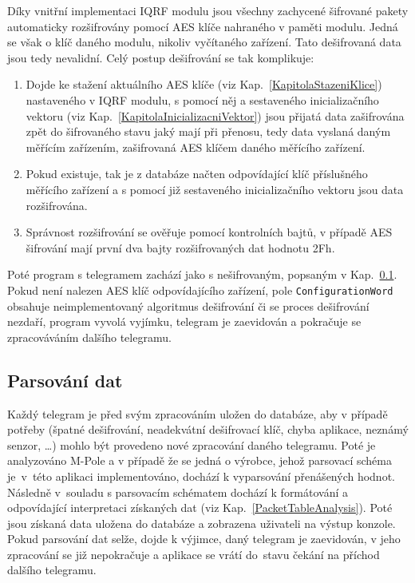 Díky vnitřní implementaci IQRF modulu jsou všechny zachycené šifrované pakety automaticky rozšifrovány pomocí AES klíče nahraného v paměti modulu. Jedná se však o klíč daného modulu, nikoliv vyčítaného zařízení. Tato dešifrovaná data jsou tedy nevalidní. Celý postup dešifrování se tak komplikuje:

\begin{enumerate}
	\item Dojde ke stažení aktuálního AES klíče (viz Kap.~\ref{KapitolaStazeniKlice}) nastaveného v IQRF modulu, s pomocí něj a sestaveného inicializačního vektoru (viz Kap.~\ref{KapitolaInicializacniVektor})
jsou přijatá data zašifrována zpět do šifrovaného stavu jaký mají při přenosu, tedy data vyslaná daným měřícím zařízením, zašifrovaná AES klíčem daného měřícího zařízení.
	\item Pokud existuje, tak je z databáze načten odpovídající klíč příslušného měřícího zařízení a s pomocí již sestaveného inicializačního vektoru jsou data rozšifrována.
	\item Správnost rozšifrování se ověřuje pomocí kontrolních bajtů, v případě AES šifrování mají první dva bajty rozšifrovaných dat hodnotu 2Fh.
\end{enumerate}

Poté program s telegramem zachází jako s nešifrovaným, popsaným v Kap.~\ref{KapitolaParsovani}. Pokud není nalezen AES klíč odpovídajícího zařízení, pole \texttt{ConfigurationWord} obsahuje neimplementovaný algoritmus dešifrování či se proces dešifrování nezdaří, program vyvolá vyjímku, telegram je zaevidován a pokračuje se zpracováváním dalšího telegramu.

\subsection{Parsování dat}
\label{KapitolaParsovani}
Každý telegram je před svým zpracováním uložen do databáze, aby v případě potřeby (špatné dešifrování, neadekvátní dešifrovací klíč, chyba aplikace, neznámý senzor, \ldots) mohlo být provedeno nové zpracování daného telegramu. Poté je analyzováno M-Pole a v případě že se jedná o výrobce, jehož parsovací schéma je~v~této aplikaci implementováno, dochází k vyparsování přenášených hodnot. Následně v~souladu s parsovacím schématem dochází k formátování a odpovídající interpretaci získaných dat (viz Kap.~\ref{PacketTableAnalysis}). Poté jsou získaná data uložena do databáze a zobrazena uživateli na výstup konzole.
Pokud parsování dat selže, dojde k výjimce, daný telegram je zaevidován, v jeho zpracování se již nepokračuje a aplikace se vrátí do~stavu čekání na příchod dalšího telegramu.

